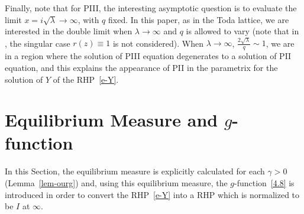 \documentclass{amsart}
\theoremstyle{definition}
\theoremstyle{remark}
\numberwithin{equation}{section}
\begin{document}
Finally, note that for PIII, the interesting asymptotic question is 
to evaluate the limit $x=i\sqrt{\lambda}\to\infty$, with $q$ fixed. 
In this paper, as in the Toda lattice, we are interested in the double 
limit when $\lambda\to\infty$ and $q$ is allowed to vary 
(note that in \cite{Ka}, the singular case $r(z)\equiv 1$ is not 
considered). 
When $\lambda\to\infty$, $\frac{2\sqrt{\lambda}}{q}\sim 1$, 
we are in a region where the solution of PIII equation degenerates 
to a solution of PII equation, and this explains the appearance of 
PII in the parametrix for the solution of $Y$ of the RHP~\eqref{e-Y}. 



\section{{\bf Equilibrium Measure and $g$-function}}
\label{s- Begin}

In this Section, the equilibrium measure is explicitly calculated 
for each $\gamma>0$ (Lemma~\ref{lem-ourg}) and, using this equilibrium measure, 
the $g$-function~\eqref{4.8} is introduced in order to 
convert the RHP~\eqref{e-Y} 
into a RHP which is normalized to be $I$ at $\infty$.
\end{document}
